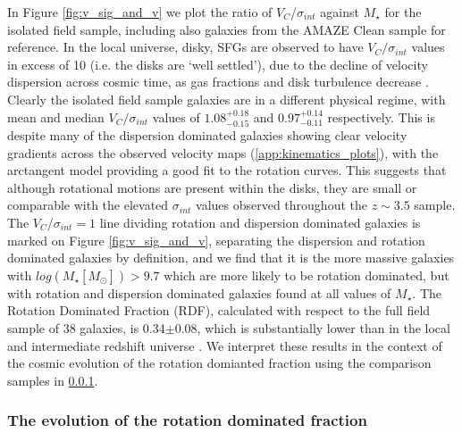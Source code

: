 \documentclass[fleqn,usenatbib]{mn2e}
\begin{document}
In Figure \ref{fig:v_sig_and_v} we plot the ratio of $V_{C}$/$\sigma_{int}$ against $M_{\star}$ for the isolated field sample, including also galaxies from the AMAZE Clean sample for reference.
In the local universe, disky, SFGs are observed to have $V_{C}/\sigma_{int}$ values in excess of 10 (i.e. the disks are `well settled'), due to the decline of velocity dispersion across cosmic time, as gas fractions and disk turbulence decrease \citep[e.g.][]{Epinat2008,Epinat2008a}.
Clearly the isolated field sample galaxies are in a different physical regime, with mean and median $V_{C}/\sigma_{int}$ values of $1.08^{+0.18}_{-0.15}$ and $0.97^{+0.14}_{-0.11}$ respectively.
This is despite many of the dispersion dominated galaxies showing clear velocity gradients across the observed velocity maps (\cref{app:kinematics_plots}), with the arctangent model providing a good fit to the rotation curves.
This suggests that although rotational motions are present within the disks, they are small or comparable with the elevated $\sigma_{int}$ values observed throughout the $z \sim 3.5$ sample. \\

The $V_{C}$/$\sigma_{int}=1$ line dividing rotation and dispersion dominated galaxies is marked on Figure \ref{fig:v_sig_and_v}, separating the dispersion and rotation dominated galaxies by definition, and we find that it is the more massive galaxies with $log(M_{\star}[M_{\odot}]) > 9.7$ which are more likely to be rotation dominated, but with rotation and dispersion dominated galaxies found at all values of $M_{\star}$.
The Rotation Dominated Fraction (RDF), calculated with respect to the full field sample of 38 galaxies, is 0.34$\pm0.08$, which is substantially lower than in the local and intermediate redshift universe \citep[e.g.][]{Epinat2008a,Epinat2008,Green2014}.
We interpret these results in the context of the cosmic evolution of the rotation domianted fraction using the comparison samples in \cref{subsubsec:RDF_evolution}.\\

\subsubsection{The evolution of the rotation dominated fraction}\label{subsubsec:RDF_evolution}
\end{document}

